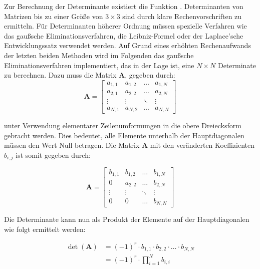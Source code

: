 Zur Berechnung der Determinante existiert die Funktion . Determinanten von Matrizen bis zu einer Größe von $3 \times 3$ sind durch klare Rechenvorschriften zu ermitteln. Für Determinanten höherer Ordnung müssen spezielle Verfahren wie das gaußsche Eliminationsverfahren, die Leibniz-Formel oder der Laplace'sche Entwicklungssatz verwendet werden. Auf Grund eines erhöhten Rechenaufwands der letzten beiden Methoden wird im Folgenden das gaußsche Eliminationsverfahren implementiert, das in der Lage ist, eine $N \times N$ Determinate zu berechnen. Dazu muss die Matrix $\mathbf{A}$, gegeben durch:
\begin{equation}
\mathbf{A} = 
    \begin{bmatrix}
        a_{1,1} & a_{1,2} & \dots  & a_{1,N} \\
        a_{2,1} & a_{2,2} & \dots  & a_{2,N} \\
        \vdots  & \vdots  & \ddots & \vdots  \\
        a_{N,1} & a_{N,2} & \dots  & a_{N,N}
    \end{bmatrix}
\end{equation}

unter Verwendung elementarer Zeilenumformungen in die obere Dreiecksform gebracht werden. Dies bedeutet, alle Elemente unterhalb der Hauptdiagonalen müssen den Wert Null betragen. Die Matrix $\mathbf{A}$ mit den veränderten Koeffizienten $b_{i,j}$ ist somit gegeben durch:

\begin{equation}
\mathbf{A} = 
    \begin{bmatrix}
        b_{1,1} & b_{1,2} & \dots  & b_{1,N} \\
        0       & a_{2,2} & \dots  & b_{2,N} \\
        \vdots  & \vdots  & \ddots & \vdots  \\
        0       & 0       & \dots  & b_{N,N}
    \end{bmatrix}
\end{equation}

Die Determinante kann nun als Produkt der Elemente auf der Hauptdiagonalen wie folgt ermittelt werden:

\begin{align}
    \det(\mathbf{A}) & = (-1)^r \cdot b_{1,1} \cdot b_{2,2} \cdot \dots \cdot b_{N,N} \\
                     & = (-1)^r \cdot \prod_{i=1}^{N} b_{i,i}
\end{align}

